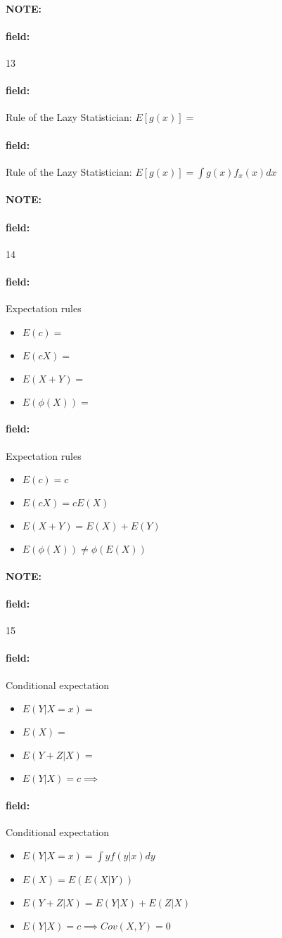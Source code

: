 \documentclass[12pt]{article}
\newenvironment{note}{\paragraph{NOTE:}}{}
\newenvironment{field}{\paragraph{field:}}{}
\begin{document}
\begin{note}
  \begin{field}
    \tiny 13
  \end{field}
  \begin{field}
     Rule of the Lazy Statistician: $ E[g(x)] = $
  \end{field}
  \begin{field}
    Rule of the Lazy Statistician:  $E[g(x)] = \int g(x)f_x(x)dx$
  \end{field}
\end{note}

\begin{note}
  \begin{field}
    \tiny 14
  \end{field}
  \begin{field}
    Expectation rules
    \begin{itemize}
      \item $E(c) = $
      \item $E(cX) = $
      \item $E(X + Y) = $
      \item $E(\phi(X)) = $
    \end{itemize}
  \end{field}
  \begin{field}
    Expectation rules
    \begin{itemize}
      \item $E(c) = c$
      \item $E(cX) = cE(X)$
      \item $E(X + Y) = E(X) + E(Y)$
      \item $E(\phi(X)) \neq \phi(E(X))$
    \end{itemize}
  \end{field}
\end{note}

\begin{note}
  \begin{field}
    \tiny 15
  \end{field}
  \begin{field}
    Conditional expectation
      \begin{itemize}
        \item $E(Y|X = x) = $
        \item $E(X) = $
        \item $E(Y+Z|X) = $
        \item $E(Y|X) = c \implies $
      \end{itemize}
  \end{field}
  \begin{field}
    Conditional expectation
      \begin{itemize}
        \item $E(Y|X = x) = \int y f(y|x) dy$
        \item $E(X) = E(E(X|Y))$
        \item $E(Y+Z|X) = E(Y|X) + E(Z|X)$
        \item $E(Y|X) = c \implies Cov(X,Y) = 0$
      \end{itemize}

  \end{field}
\end{note}
\end{document}
